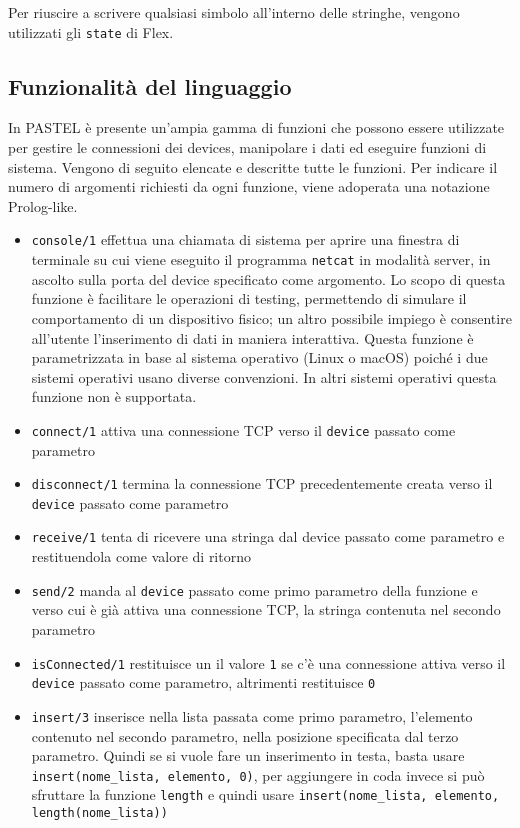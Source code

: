 \documentclass[10pt]{article}
\begin{document}
Per riuscire a scrivere qualsiasi simbolo all'interno delle stringhe, vengono utilizzati gli \texttt{state} di Flex.

\subsection{Funzionalità del linguaggio}\label{subsection:fun}
In PASTEL è presente un'ampia gamma di funzioni che possono essere utilizzate per gestire le connessioni dei devices, manipolare i dati ed eseguire funzioni di sistema. Vengono di seguito elencate e descritte tutte le funzioni. Per indicare il numero di argomenti richiesti da ogni funzione, viene adoperata una notazione Prolog-like.
\begin{itemize}
\item \texttt{console/1} effettua una chiamata di sistema per aprire una finestra di terminale su cui viene eseguito il programma \texttt{netcat} in modalità server, in ascolto sulla porta del device specificato come argomento. Lo scopo di questa funzione è facilitare le operazioni di testing, permettendo di simulare il comportamento di un dispositivo fisico; un altro possibile impiego è consentire all'utente l'inserimento di dati in maniera interattiva. Questa funzione è parametrizzata in base al sistema operativo (Linux o macOS) poiché i due sistemi operativi usano diverse convenzioni. In altri sistemi operativi questa funzione non è supportata.
\item \texttt{connect/1} attiva una connessione TCP verso il \texttt{device} passato come parametro
\item \texttt{disconnect/1} termina la connessione TCP precedentemente creata verso il \texttt{device} passato come parametro
\item \texttt{receive/1} tenta di ricevere una stringa dal device passato come parametro e restituendola come valore di ritorno
\item \texttt{send/2} manda al \texttt{device} passato come primo parametro della funzione e verso cui è già attiva una connessione TCP, la stringa contenuta nel secondo parametro
\item \texttt{isConnected/1} restituisce un il valore \texttt{1} se c'è una connessione attiva verso il \texttt{device} passato come parametro, altrimenti restituisce \texttt{0}
\item \texttt{insert/3} inserisce nella lista passata come primo parametro, l'elemento contenuto nel secondo parametro, nella posizione specificata dal terzo parametro. Quindi se si vuole fare un inserimento in testa, basta usare \texttt{insert(nome\_lista, elemento, 0)}, per aggiungere in coda invece si può sfruttare la funzione \texttt{length} e quindi usare \texttt{insert(nome\_lista, elemento, length(nome\_lista))}

\end{itemize}
\end{document}
